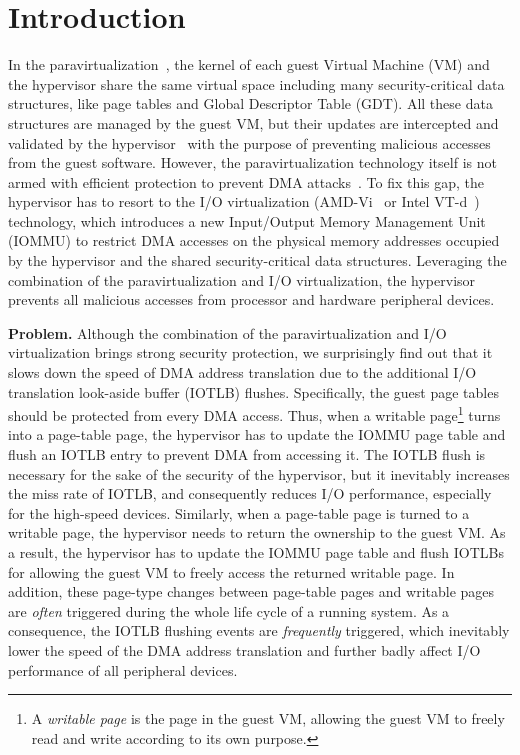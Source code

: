 \section{Introduction} \label{sec:intro}
In the paravirtualization~\cite{XEN-SOSP03,denali-paravirtualization}, the kernel of each guest Virtual Machine (VM) and the hypervisor share the same virtual space including many security-critical data structures, like page tables and Global Descriptor Table (GDT). All these data structures are managed by the guest VM, but their updates are intercepted and validated by the hypervisor~\cite{XEN-SOSP03} with the purpose of preventing malicious accesses from the guest software.
However, the paravirtualization technology itself is not armed with efficient protection to prevent DMA attacks~\cite{disaggregation}.
To fix this gap, the hypervisor has to resort to the I/O virtualization (AMD-Vi~\cite{amdvt} or Intel VT-d~\cite{intelvt}) technology, which introduces a new Input/Output Memory Management Unit (IOMMU) to restrict DMA accesses on the physical memory addresses occupied by the hypervisor and the shared security-critical data structures.
Leveraging the combination of the paravirtualization and I/O virtualization, the hypervisor prevents all malicious accesses from processor and hardware peripheral devices.

\textbf{Problem.} Although the combination of the paravirtualization and I/O virtualization brings strong security protection, we surprisingly find out that it slows down the speed of DMA address translation due to the additional I/O translation look-aside buffer (IOTLB) flushes.
Specifically, the guest page tables should be protected from every DMA access.
Thus, when a writable page\footnote{A \emph{writable page} is the page in the guest VM, allowing the guest VM to freely read and write according to its own purpose.} turns into a page-table page, the hypervisor has to update the IOMMU page table and flush an IOTLB entry to prevent DMA from accessing it.
The IOTLB flush is necessary for the sake of the security of the hypervisor, but it inevitably increases the miss rate of IOTLB, and consequently reduces I/O performance, especially for the high-speed devices.
Similarly, when a page-table page is turned to a writable page, the hypervisor needs to return the ownership to the guest VM.
As a result, the hypervisor has to update the IOMMU page table and flush IOTLBs for allowing the guest VM to freely access the returned writable page.
In addition, these page-type changes between page-table pages and writable pages are \emph{often} triggered during the whole life cycle of a running system.
As a consequence, the IOTLB flushing events are \emph{frequently} triggered, which inevitably lower the speed of the DMA address translation and further badly affect I/O performance of all peripheral devices.

